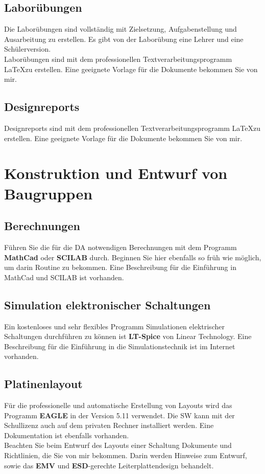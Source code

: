 \documentclass[a4paper, 12pt, xcolor=dvipsnames]{scrartcl}		%
\begin{document}
\subsection{Laborübungen}
Die Laborübungen sind vollständig mit Zielsetzung, Aufgabenstellung und Ausarbeitung zu erstellen. Es gibt von der Laborübung eine Lehrer und eine Schülerversion.\\
Laborübungen sind mit dem professionellen Textverarbeitungsprogramm \LaTeX zu erstellen. Eine geeignete Vorlage für die Dokumente bekommen Sie von mir.
\vspace{-0.6cm}

\subsection{Designreports}
Designreports sind mit dem professionellen Textverarbeitungsprogramm \LaTeX zu erstellen. Eine geeignete Vorlage für die Dokumente bekommen Sie von mir.
\vspace{-0.6cm}

\pagebreak

\section{Konstruktion und Entwurf von Baugruppen}
\subsection{Berechnungen}
Führen Sie die für die DA notwendigen Berechnungen mit dem Programm \textbf{MathCad} oder \textbf{SCILAB} durch. Beginnen Sie hier ebenfalls so früh wie möglich, um darin Routine zu bekommen. Eine Beschreibung für die Einführung in MathCad und SCILAB ist vorhanden.
\vspace{-0.6cm}

\subsection{Simulation elektronischer Schaltungen}
Ein kostenloses und sehr flexibles Programm Simulationen elektrischer Schaltungen durchführen zu können ist \textbf{LT-Spice} von Linear Technology. Eine Beschreibung für die Einführung in die Simulationstechnik ist im Internet vorhanden.
\vspace{-0.6cm}

\subsection{Platinenlayout}
Für die professionelle und automatische Erstellung von Layouts wird das Programm \textbf{EAGLE} in der Version 5.11 verwendet. Die SW kann mit der Schullizenz auch auf dem privaten Rechner installiert werden. Eine Dokumentation ist ebenfalls vorhanden.\\
Beachten Sie beim Entwurf des Layouts einer Schaltung Dokumente und Richtlinien, die Sie von mir bekommen. Darin werden Hinweise zum Entwurf, sowie das \textbf{EMV} und \textbf{ESD}-gerechte Leiterplattendesign behandelt.
\end{document}
